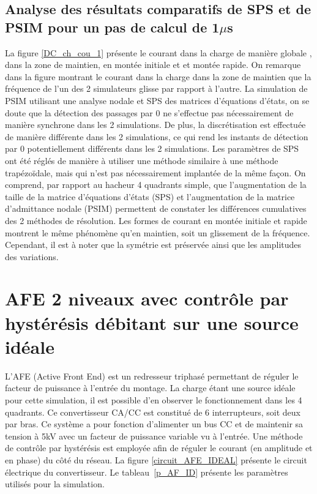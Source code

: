\clearpage

\subsection{Analyse des résultats comparatifs de SPS et de PSIM pour un pas de calcul de 1$\mu$s}

La figure \ref{DC_ch_cou_1} présente le courant dans la charge de manière globale , dans la zone de maintien, en montée initiale et et montée rapide. On remarque dans la figure montrant le courant dans la charge dans la zone de maintien que la fréquence de l'un des 2 simulateurs glisse par rapport à l'autre. La simulation de PSIM utilisant une analyse nodale et SPS des matrices d'équations d'états, on se doute que la détection des passages par 0 ne s'effectue pas nécessairement de manière synchrone dans les 2 simulations. De plus, la discrétisation est effectuée de manière différente dans les 2 simulations, ce qui rend les instants de détection par 0 potentiellement différents dans les 2 simulations. Les paramètres de SPS ont été réglés de manière à utiliser une méthode similaire à une méthode trapézoïdale, mais qui n'est pas nécessairement implantée de la même façon. On comprend, par rapport au hacheur 4 quadrants simple, que l'augmentation de la taille de la matrice d'équations d'états (SPS) et l'augmentation de la matrice d'admittance nodale (PSIM) permettent de constater les différences cumulatives des 2 méthodes de résolution. Les formes de courant en montée initiale et rapide montrent le même phénomène qu'en maintien, soit un glissement de la fréquence. Cependant, il est à noter que la symétrie est préservée ainsi que les amplitudes des variations.
\section{AFE 2 niveaux avec contrôle par hystérésis débitant sur une source idéale}
L'AFE (Active Front End) est un redresseur triphasé permettant de réguler le facteur de puissance à l'entrée du montage. La charge étant une source idéale pour cette simulation, il est possible d'en observer le fonctionnement dans les 4 quadrants. Ce convertisseur CA/CC est constitué de 6 interrupteurs, soit deux par bras. Ce système a pour fonction d'alimenter un bus CC et de maintenir sa tension à 5kV avec un facteur de puissance variable vu à l'entrée. Une méthode de contrôle par hystérésis est employée afin de réguler le courant (en amplitude et en phase) du côté du réseau. La figure \ref{circuit_AFE_IDEAL} présente le circuit électrique du convertisseur. Le tableau~\ref{p_AF_ID} présente les paramètres utilisés pour la simulation.

